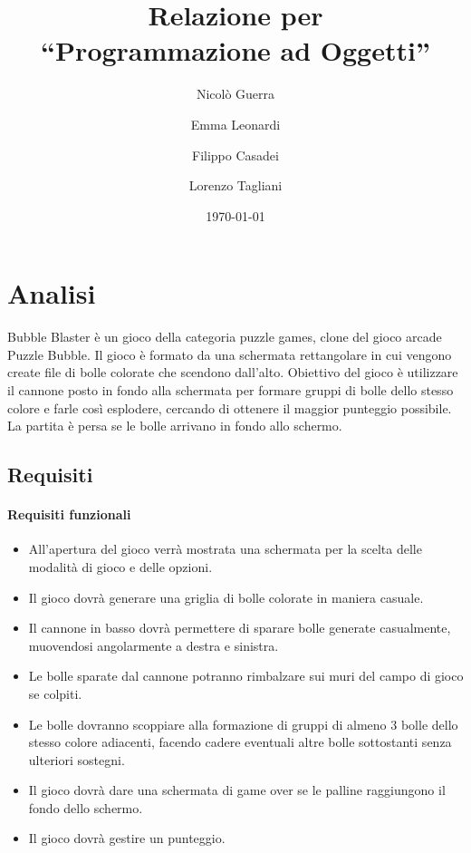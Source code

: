 \documentclass[a4paper,12pt]{report}
\title{Relazione per\\``Programmazione ad Oggetti''}
\author{Nicolò Guerra \and
Emma Leonardi \and 
Filippo Casadei \and
Lorenzo Tagliani}
\date{\today}
\begin{document}
\maketitle

\tableofcontents

\chapter{Analisi}

Bubble Blaster è un gioco della categoria puzzle games, clone del gioco arcade Puzzle Bubble. Il gioco è formato da una schermata
rettangolare in cui vengono create file di bolle colorate che scendono dall'alto. Obiettivo del gioco è utilizzare il cannone
posto in fondo alla schermata per formare gruppi di bolle dello stesso colore e farle così esplodere, cercando di ottenere il maggior
punteggio possibile. La partita è persa se le bolle arrivano in fondo allo schermo.

\section{Requisiti}

\subsubsection{Requisiti funzionali}
\begin{itemize}
	\item All'apertura del gioco verrà mostrata una schermata per la scelta delle modalità di gioco e delle opzioni.
	\item Il gioco dovrà generare una griglia di bolle colorate in maniera casuale.
	\item Il cannone in basso dovrà permettere di sparare bolle generate casualmente, muovendosi angolarmente a destra e sinistra.
	\item Le bolle sparate dal cannone potranno rimbalzare sui muri del campo di gioco se colpiti.
	\item Le bolle dovranno scoppiare alla formazione di gruppi di almeno 3 bolle dello stesso colore adiacenti, facendo cadere eventuali altre bolle sottostanti senza ulteriori sostegni.
	\item Il gioco dovrà dare una schermata di game over se le palline raggiungono il fondo dello schermo.
	\item Il gioco dovrà gestire un punteggio.
\end{itemize}
\end{document}
